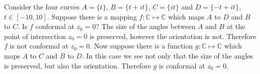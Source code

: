 \documentclass[12pt]{article}
\begin{document}
Consider the four curves $A=\{t\}$, $B=\{t+it\}$, $C=\{it\}$ and $D=\{-t+it\}$, $t\in[-10,10]$. Suppose there is a mapping $f:\mathbb{C}\mapsto\mathbb{C}$ which maps $A$ to $D$ and $B$ to $C$. Is $f$ conformal at $z_0=0$? The size of the angles between $A$ and $B$ at the point of intersection $z_0=0$ is preserved, however the orientation is not. Therefore $f$ is not conformal at $z_0=0$. Now suppose there is a function $g:\mathbb{C}\mapsto\mathbb{C}$ which maps $A$ to $C$ and $B$ to $D$. In this case we see not only that the size of the angles is preserved, but also the orientation. Therefore $g$ is conformal at $z_0=0$.
\end{document}
